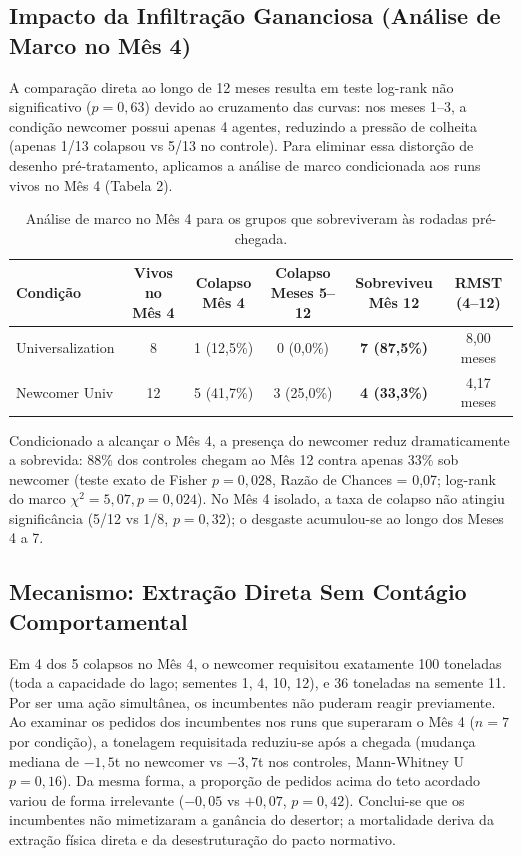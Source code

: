 ﻿\documentclass[11pt,a4paper]{article}
\begin{document}
\subsection{Impacto da Infiltração Gananciosa (Análise de Marco no Mês 4)}
A comparação direta ao longo de 12 meses resulta em teste log-rank não significativo ($p = 0,63$) devido ao cruzamento das curvas: nos meses 1--3, a condição newcomer possui apenas 4 agentes, reduzindo a pressão de colheita (apenas 1/13 colapsou vs 5/13 no controle). Para eliminar essa distorção de desenho pré-tratamento, aplicamos a análise de marco condicionada aos runs vivos no Mês 4 (Tabela 2).

\begin{table}[h]
\centering
\small
\caption{Análise de marco no Mês 4 para os grupos que sobreviveram às rodadas pré-chegada.}
\vspace{0.1cm}
\begin{tabular}{lccccc}
\toprule
\textbf{Condição} & \textbf{Vivos no Mês 4} & \textbf{Colapso Mês 4} & \textbf{Colapso Meses 5--12} & \textbf{Sobreviveu Mês 12} & \textbf{RMST (4--12)} \\
\midrule
Universalization & 8 & 1 (12,5\%) & 0 (0,0\%) & \textbf{7 (87,5\%)} & 8,00 meses \\
Newcomer Univ & 12 & 5 (41,7\%) & 3 (25,0\%) & \textbf{4 (33,3\%)} & 4,17 meses \\
\bottomrule
\end{tabular}
\end{table}

Condicionado a alcançar o Mês 4, a presença do newcomer reduz dramaticamente a sobrevida: 88\% dos controles chegam ao Mês 12 contra apenas 33\% sob newcomer (teste exato de Fisher $p = 0,028$, Razão de Chances = 0,07; log-rank do marco $\chi^2 = 5,07, p = 0,024$). No Mês 4 isolado, a taxa de colapso não atingiu significância (5/12 vs 1/8, $p = 0,32$); o desgaste acumulou-se ao longo dos Meses 4 a 7.

\subsection{Mecanismo: Extração Direta Sem Contágio Comportamental}
Em 4 dos 5 colapsos no Mês 4, o newcomer requisitou exatamente 100 toneladas (toda a capacidade do lago; sementes 1, 4, 10, 12), e 36 toneladas na semente 11. Por ser uma ação simultânea, os incumbentes não puderam reagir previamente. Ao examinar os pedidos dos incumbentes nos runs que superaram o Mês 4 ($n = 7$ por condição), a tonelagem requisitada reduziu-se após a chegada (mudança mediana de $-1,5$t no newcomer vs $-3,7$t nos controles, Mann-Whitney U $p = 0,16$). Da mesma forma, a proporção de pedidos acima do teto acordado variou de forma irrelevante ($-0,05$ vs $+0,07$, $p = 0,42$). Conclui-se que os incumbentes não mimetizaram a ganância do desertor; a mortalidade deriva da extração física direta e da desestruturação do pacto normativo.
\end{document}
